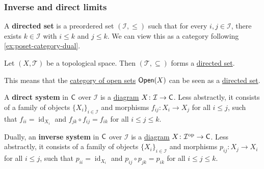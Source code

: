 \documentclass[../../main]{subfiles}
\begin{document}
\subsubsection{Inverse and direct limits}

\begin{definition}\label{def:directed-set}
  A \textbf{directed set} is a preordered set \((\mathcal{I}, \leq)\) such that for every \(i, j \in \mathcal{I}\), there exists \(k \in \mathcal{I}\) with \(i \leq k\) and \(j \leq k\).
  We can view this as a category following \autoref{ex:poset-category-dual}.
\end{definition}

\begin{example}
  Let \((X, \mathcal{T})\) be a topological space.
  Then \((\mathcal{T}, \subseteq)\) forms a \hyperref[def:directed-set]{directed set}.
  
  This means that the \hyperref[ex:open-set-category]{category of open sets} \(\mathsf{Open}(X)\) can be seen as a \hyperref[def:directed-set]{directed set}.
\end{example}

\begin{definition}\label{def:direct-inverse-system}
  A \textbf{direct system} in \(\mathsf{C}\) over \(\mathcal{I}\) is a \hyperref[def:diagram]{diagram} \(X\colon \mathcal{I} \to \mathsf{C}\).
  Less abstractly, it consists of a family of objects \(\{X_{i}\}_{i \in \mathcal{I}}\) and morphisms \(f_{ij}\colon X_{i} \to X_{j}\) for all \(i \leq j\), such that \(f_{ii} = \operatorname{id}_{X_{i}}\) and \(f_{jk} \circ f_{ij} = f_{ik}\) for all \(i \leq j \leq k\).
 
  Dually, an \textbf{inverse system} in \(\mathsf{C}\) over \(\mathcal{I}\) is a \hyperref[def:diagram]{diagram} \(X\colon \mathcal{I}^{\operatorname{op}} \to \mathsf{C}\).
  Less abstractly, it consists of a family of objects \(\{X_{i}\}_{i \in \mathcal{I}}\) and morphisms \(p_{ij}\colon X_{j} \to X_{i}\) for all \(i \leq j\), such that \(p_{ii} = \operatorname{id}_{X_{i}}\) and \(p_{ij} \circ p_{jk} = p_{ik}\) for all \(i \leq j \leq k\).
\end{definition}
\end{document}
